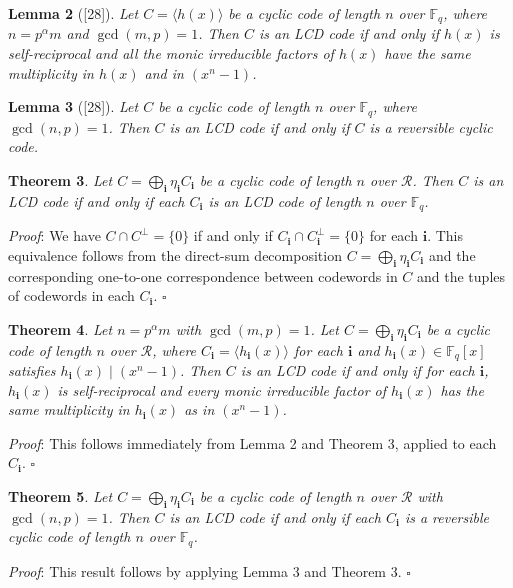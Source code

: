 \documentclass[12pt]{article}
\begin{document}
\textbf{Lemma 2} ([28]). \textit{Let $C = \langle h(x) \rangle$ be a cyclic code of length $n$ over $\mathbb{F}_q$, where $n = p^\alpha m$ and $\gcd(m, p) = 1$. Then $C$ is an LCD code if and only if $h(x)$ is self-reciprocal and all the monic irreducible factors of $h(x)$ have the same multiplicity in $h(x)$ and in $(x^n - 1)$.}

\textbf{Lemma 3} ([28]). \textit{Let $C$ be a cyclic code of length $n$ over $\mathbb{F}_q$, where $\gcd(n, p) = 1$. Then $C$ is an LCD code if and only if $C$ is a reversible cyclic code.}

\textbf{Theorem 3}. \textit{Let $C = \bigoplus\limits_{\mathbf{i}} \eta_{\mathbf{i}} C_{\mathbf{i}}$ be a cyclic code of length $n$ over $\mathcal{R}$. Then $C$ is an LCD code if and only if each $C_{\mathbf{i}}$ is an LCD code of length $n$ over $\mathbb{F}_q$.}

\textit{Proof}: We have $C \cap C^{\perp} = \{0\}$ if and only if $C_{\mathbf{i}} \cap C_{\mathbf{i}}^{\perp} = \{0\}$ for each $\mathbf{i}$. This equivalence follows from the direct-sum decomposition $C = \bigoplus_{\mathbf{i}} \eta_{\mathbf{i}} C_{\mathbf{i}}$ and the corresponding one-to-one correspondence between codewords in $C$ and the tuples of codewords in each $C_{\mathbf{i}}$. $\square$

\textbf{Theorem 4}. \textit{Let $n = p^\alpha m$ with $\gcd(m, p) = 1$. Let $C = \bigoplus\limits_{\mathbf{i}} \eta_{\mathbf{i}} C_{\mathbf{i}}$ be a cyclic code of length $n$ over $\mathcal{R}$, where $C_{\mathbf{i}} = \langle h_{\mathbf{i}}(x) \rangle$ for each $\mathbf{i}$ and $h_{\mathbf{i}}(x) \in \mathbb{F}_q[x]$ satisfies $h_{\mathbf{i}}(x) \mid (x^n - 1)$. Then $C$ is an LCD code if and only if for each $\mathbf{i}$, $h_{\mathbf{i}}(x)$ is self-reciprocal and every monic irreducible factor of $h_{\mathbf{i}}(x)$ has the same multiplicity in $h_{\mathbf{i}}(x)$ as in $(x^n - 1)$.}

\textit{Proof}: This follows immediately from Lemma 2 and Theorem 3, applied to each $C_{\mathbf{i}}$. $\square$

\textbf{Theorem 5}. \textit{Let $C = \bigoplus\limits_{\mathbf{i}} \eta_{\mathbf{i}} C_{\mathbf{i}}$ be a cyclic code of length $n$ over $\mathcal{R}$ with $\gcd(n, p) = 1$. Then $C$ is an LCD code if and only if each $C_{\mathbf{i}}$ is a reversible cyclic code of length $n$ over $\mathbb{F}_q$.}

\textit{Proof}: This result follows by applying Lemma 3 and Theorem 3. $\square$
\end{document}

